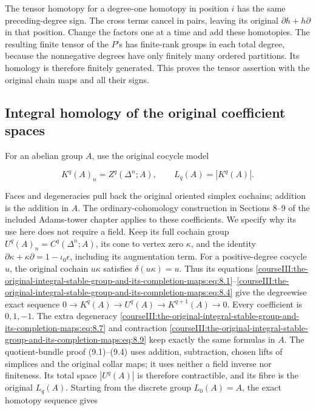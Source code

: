 The tensor homotopy for a degree-one homotopy in position \(i\) has the same preceding-degree sign. The cross terms cancel in pairs, leaving its original \(\partial h+h\partial\) in that position. Change the factors one at a time and add these homotopies. The resulting finite tensor of the \(P\)'s has finite-rank groups in each total degree, because the nonnegative degrees have only finitely many ordered partitions. Its homology is therefore finitely generated. This proves the tensor assertion with the original chain maps and all their signs.

\subsection{Integral homology of the original coefficient spaces}
\label{courseIII:the-original-integral-stable-group-and-its-completion-maps:integral-coefficient-spaces}

\label{courseIII:the-original-integral-stable-group-and-its-completion-maps:section-2}\label{courseIII:integral-stable:2}

For an abelian group \(A\), use the original cocycle model

\begin{equation}
K^q(A)_n=Z^q(\Delta^n;A),\qquad
 L_q(A)=|K^q(A)|.
 \label{courseIII:the-original-integral-stable-group-and-its-completion-maps:eq:2.1}
\end{equation}

Faces and degeneracies pull back the original oriented simplex cochains; addition is the addition in \(A\). The ordinary-cohomology construction in Sections 8--9 of the included Adams-tower chapter applies to these coefficients. We specify why its use here does not require a field. Keep its full cochain group \(U^q(A)_n=C^q(\Delta^n;A)\), its cone to vertex zero \(\kappa\), and the identity \(\partial\kappa+\kappa\partial=1-\iota_0\epsilon\), including its augmentation term. For a positive-degree cocycle \(u\), the original cochain \(u\kappa\) satisfies \(\delta(u\kappa)=u\). Thus its equations \eqref{courseIII:the-original-integral-stable-group-and-its-completion-maps:eq:8.1}--\eqref{courseIII:the-original-integral-stable-group-and-its-completion-maps:eq:8.4} give the degreewise exact sequence \(0\to K^q(A)\to U^q(A)\to K^{q+1}(A)\to0\). Every coefficient is \(0,1,-1\). The extra degeneracy \eqref{courseIII:the-original-integral-stable-group-and-its-completion-maps:eq:8.7} and contraction \eqref{courseIII:the-original-integral-stable-group-and-its-completion-maps:eq:8.9} keep exactly the same formulas in \(A\). The quotient-bundle proof (9.1)--(9.4) uses addition, subtraction, chosen lifts of simplices and the original collar maps; it uses neither a field inverse nor finiteness. Its total space \(|U^q(A)|\) is therefore contractible, and its fibre is the original \(L_q(A)\). Starting from the discrete group \(L_0(A)=A\), the exact homotopy sequence gives

